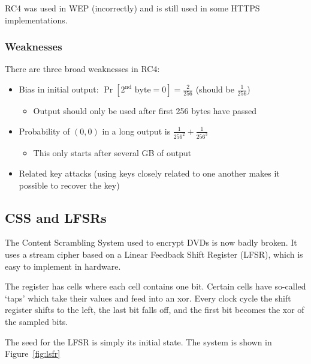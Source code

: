 \documentclass[10pt,a4paper]{report}
\begin{document}
RC4 was used in WEP (incorrectly) and is still used in some HTTPS implementations.

\subsubsection*{Weaknesses}

There are three broad weaknesses in RC4:

\begin{itemize}
    \item Bias in initial output: $\operatorname{Pr}[2^\text{nd} \text{ byte} = 0] =
        \tfrac{2}{256}$ (should be $\tfrac{1}{256}$)
    \begin{itemize}
        \item Output should only be used after first 256 bytes have passed
    \end{itemize}

    \item Probability of $(0,0)$ in a long output is $\tfrac{1}{256^2} + \tfrac{1}{256^3}$
    \begin{itemize}
        \item This only starts after several GB of output
    \end{itemize}

    \item Related key attacks (using keys closely related to one another makes it possible to
        recover the key)
\end{itemize}

\subsection{CSS and LFSRs}

The Content Scrambling System used to encrypt DVDs is now badly broken. It uses a stream cipher
based on a Linear Feedback Shift Register (LFSR), which is easy to implement in hardware.

The register has cells where each cell contains one bit. Certain cells have so-called `taps' which
take their values and feed into an xor. Every clock cycle the shift register shifts to the left,
the last bit falls off, and the first bit becomes the xor of the sampled bits.

The seed for the LFSR is simply its initial state. The system is shown in Figure~\ref{fig:lsfr}
\end{document}
